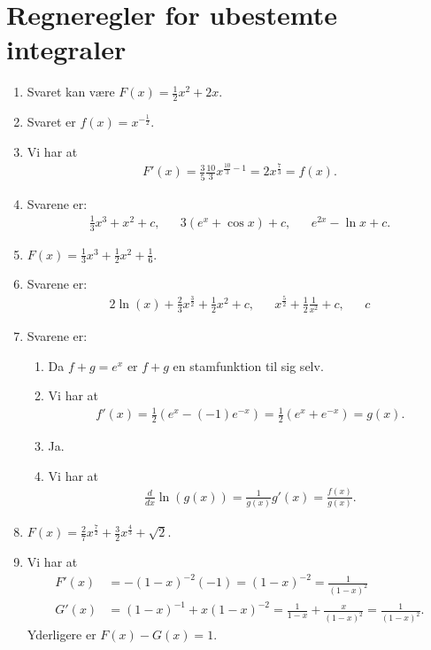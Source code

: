 \section{Regneregler for ubestemte integraler}

\begin{enumerate}
	\item Svaret kan være $F(x)=\frac{1}{2}x^2+2x$.
	
	\item Svaret er $f(x)= x^{-\frac{1}{2}}$.
	
	\item Vi har at
	\begin{align*}
	F'(x)=\frac{3}{5}\frac{10}{3}x^{\frac{10}{3}-1}=2x^{\frac{7}{3}}=f(x).
	\end{align*}
	
	
	\item Svarene er:
	\begin{align*}
	\frac{1}{3}x^3+x^2+c,&& 3(e^x+\cos x)+c,&& e^{2x}-\ln x+c.
	\end{align*}
	
	\item $F(x)=\frac{1}{3}x^3+\frac{1}{2}x^2+\frac{1}{6}$.
	
	\item Svarene er:
	\begin{align*}
	2\ln(x)+\frac{2}{3}x^{\frac{3}{2}}+\frac{1}{2}x^2+c,&& x^{\frac{5}{2}}+\frac{1}{2}\frac{1}{x^2} +c,&& c
	\end{align*}
	
	\item\label{it:int11ans} Svarene er:
	\begin{enumerate}
		\item Da $f+g=e^x$ er $f+g$ en stamfunktion til sig selv.
		\item Vi har at
		\begin{align*}
		f'(x)=\frac{1}{2}(e^x-(-1)e^{-x})=\frac{1}{2}(e^x+e^{-x})=g(x).
		\end{align*}
		\item Ja.
		\item Vi har at
		\begin{align*}
		\frac{d}{dx}\ln(g(x))=\frac{1}{g(x)}g'(x)=\frac{f(x)}{g(x)}.
		\end{align*}
	\end{enumerate}

	\item $F(x)=\frac{2}{7}x^{\frac{7}{2}}+\frac{3}{2}x^{\frac{4}{3}}+\sqrt{2}$.
	
	\item Vi har at 
	\begin{align*}
	F'(x)&=-(1-x)^{-2}(-1)=(1-x)^{-2}=\frac{1}{(1-x)^2}\\
	G'(x)&=(1-x)^{-1}+x(1-x)^{-2}=\frac{1}{1-x}+\frac{x}{(1-x)^2}=\frac{1}{(1-x)^2}.
	\end{align*}
	Yderligere er $F(x)-G(x)=1$.


\end{enumerate}
